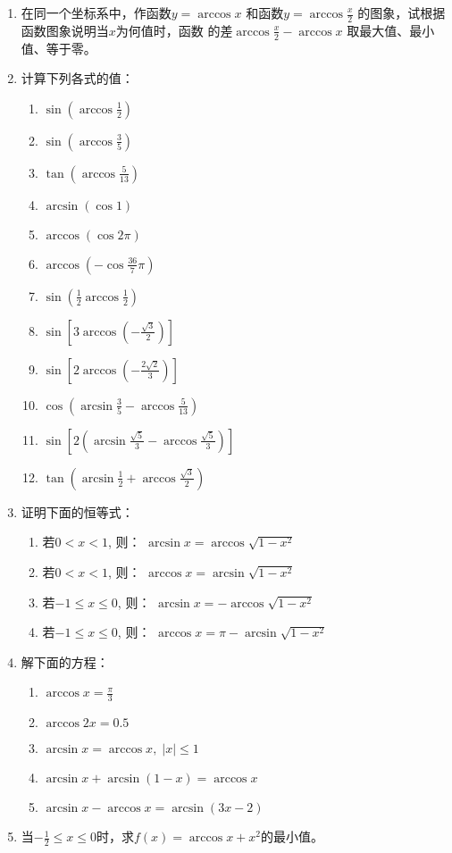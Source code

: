 \begin{enumerate}
\item 在同一个坐标系中，作函数$y=\arccos x$
和函数$y=\arccos\frac{x}{2}$
的图象，试根据函数图象说明当$x$为何值时，函数
的差$\arccos\frac{x}{2}-\arccos x$
取最大值、最小值、等于零。
\item 计算下列各式的值：
\begin{multicols}{2}
    \begin{enumerate}
\item $\sin \left(\arccos \frac{1}{2}\right)$
\item $\sin \left(\arccos \frac{3}{5}\right)$
\item $\tan \left(\arccos \frac{5}{13}\right)$
\item $\arcsin (\cos 1)$
\item $\arccos (\cos 2 \pi)$
\item $\arccos \left(-\cos \frac{36}{7} \pi\right)$
\item $\sin \left(\frac{1}{2} \arccos \frac{1}{2}\right)$
\item $\sin \left[3 \arccos \left(-\frac{\sqrt{3}}{2}\right)\right]$
\item $\sin \left[2 \arccos \left(-\frac{2 \sqrt{2}}{3}\right)\right]$
\item $\cos \left(\arcsin \frac{3}{5}-\arccos \frac{5}{13}\right)$    
\item $\sin\left[2\left(\arcsin\frac{\sqrt{5}}{3}-\arccos\frac{\sqrt{5}}{3}\right)\right]$
    \item $\tan\left(\arcsin\frac{1}{2}+\arccos\frac{\sqrt{3}}{2}\right)$
    \end{enumerate}
\end{multicols}

\item 证明下面的恒等式：
\begin{enumerate}
\item 若$0<x<1$, 则：
$\arcsin x=\arccos\sqrt{1-x^2}$
\item 若$0<x<1$, 则：
$\arccos x=\arcsin\sqrt{1-x^2}$
\item 若$-1\le x\le 0$, 则：
$\arcsin x=-\arccos\sqrt{1-x^2}$
\item 若$-1\le x\le 0$, 则：
$\arccos x=\pi-\arcsin\sqrt{1-x^2}$
\end{enumerate}

\item 解下面的方程：
    \begin{enumerate}
\item $\arccos x=\frac{\pi}{3}$
\item $\arccos 2x=0.5$
\item $\arcsin x=\arccos x,\; |x|\le 1$
\item $\arcsin x+\arcsin (1-x)=\arccos x$
\item $\arcsin x-\arccos x=\arcsin (3x-2)$
    \end{enumerate}

\item 当$-\frac{1}{2}\le x\le 0$时，求$f(x)
=\arccos x+x^2$的最小值。
\end{enumerate}

